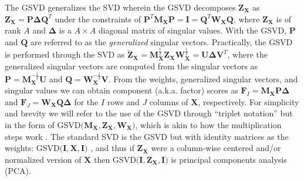\documentclass[12pt]{article}
\begin{document}
The GSVD generalizes the SVD wherein the GSVD decomposes
\({\mathbf Z}_{\mathbf X}\) as
\({\mathbf Z}_{\mathbf X} = {\mathbf P} {\boldsymbol \Delta} {\mathbf Q}^{T}\)
under the constraints of
\({\mathbf P}^{T}{\mathbf M}_{{\mathbf X}}{\mathbf P} = {\mathbf I} = {\mathbf Q}^{T}{\mathbf W}_{{\mathbf X}}{\mathbf Q}\),
where \({\mathbf Z}_{\mathbf X}\) is of rank \(A\) and
\({\boldsymbol \Delta}\) is a \(A \times A\) diagonal matrix of singular
values. With the GSVD, \({\mathbf P}\) and \({\mathbf Q}\) are referred
to as the \emph{generalized} singular vectors. Practically, the GSVD is
performed through the SVD as
\(\widetilde{{\mathbf Z}}_{\mathbf X} = {\mathbf M}_{{\mathbf X}}^{\frac{1}{2}}{\mathbf Z}_{\mathbf X}{\mathbf W}_{{\mathbf X}}^{\frac{1}{2}} = {\mathbf U} {\boldsymbol \Delta} {\mathbf V}^{T}\),
where the generalized singular vectors are computed from the singular
vectors as
\({\mathbf P} = {\mathbf M}_{{\mathbf X}}^{-\frac{1}{2}}{\mathbf U}\)
and
\({\mathbf Q} = {\mathbf W}_{{\mathbf X}}^{-\frac{1}{2}}{\mathbf V}\).
From the weights, generalized singular vectors, and singular values we
can obtain component (a.k.a. factor) scores as
\({\mathbf F}_{I} = {\mathbf M}_{{\mathbf X}}{\mathbf P}{\boldsymbol \Delta}\)
and
\({\mathbf F}_{J} = {\mathbf W}_{{\mathbf X}}{\mathbf Q}{\boldsymbol \Delta}\)
for the \(I\) rows and \(J\) columns of \({\mathbf X}\), respectively.
For simplicity and brevity we will refer to the use of the GSVD through
``triplet notation'' \citep{holmes_multivariate_2008} but in the form of
\(\mathrm{GSVD(} {\mathbf M}_{{\mathbf X}}, {\mathbf Z}_{\mathbf X}, {\mathbf W}_{{\mathbf X}} \mathrm{)}\),
which is akin to how the multiplication steps work \citep[see
also][]{beaton2018generalization}. The standard SVD is the GSVD but with
identity matrices as the weights:
\(\mathrm{GSVD(} {\mathbf I}, {\mathbf X}, {\mathbf I} \mathrm{)}\)
\citep[see also][]{takane_relationships_2003}, and thus if
\({\mathbf Z}_{\mathbf X}\) were a column-wise centered and/or
normalized version of \({\mathbf X}\) then
\(\mathrm{GSVD(} {\mathbf I}, {\mathbf Z}_{\mathbf X}, {\mathbf I} \mathrm{)}\)
is principal components analysis (PCA).
\end{document}
